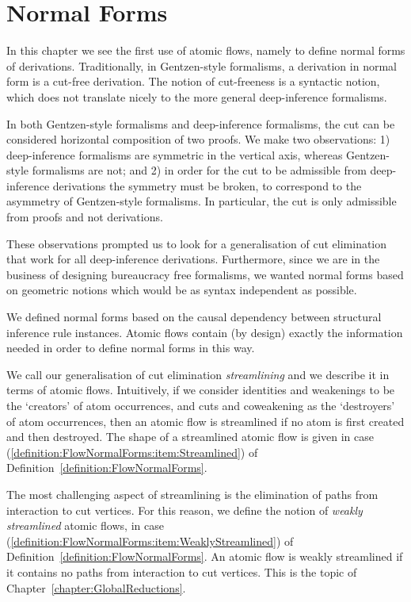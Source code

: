 \chapter{Normal Forms}\label{chapter:NormalForms}

In this chapter we see the first use of atomic flows, namely to define normal forms of derivations. Traditionally, in Gentzen-style formalisms, a derivation in normal form is a cut-free derivation. The notion of cut-freeness is a syntactic notion, which does not translate nicely to the more general deep-inference formalisms.

In both Gentzen-style formalisms and deep-inference formalisms, the cut can be considered horizontal composition of two proofs. We make two observations: 1) deep-inference formalisms are symmetric in the vertical axis, whereas Gentzen-style formalisms are not; and 2) in order for the cut to be admissible from deep-inference derivations the symmetry must be broken, to correspond to the asymmetry of Gentzen-style formalisms. In particular, the cut is only admissible from proofs and not derivations.

These observations prompted us to look for a generalisation of cut elimination that work for all deep-inference derivations. Furthermore, since we are in the business of designing bureaucracy free formalisms, we wanted normal forms based on geometric notions which would be as syntax independent as possible.

We defined normal forms based on the causal dependency between structural inference rule instances. Atomic flows contain (by design) exactly the information needed in order to define normal forms in this way.

We call our generalisation of cut elimination \emph{streamlining} and we describe it in terms of atomic flows. Intuitively, if we consider identities and weakenings to be the `creators' of atom occurrences, and cuts and coweakening as the `destroyers' of atom occurrences, then an atomic flow is streamlined if no atom is first created and then destroyed. The shape of a streamlined atomic flow is given in case (\ref{definition:FlowNormalForms:item:Streamlined}) of Definition~\ref{definition:FlowNormalForms}.

The most challenging aspect of streamlining is the elimination of paths from interaction to cut vertices. For this reason, we define the notion of \emph{weakly streamlined} atomic flows, in case (\ref{definition:FlowNormalForms:item:WeaklyStreamlined}) of Definition~\ref{definition:FlowNormalForms}. An atomic flow is weakly streamlined if it contains no paths from interaction to cut vertices. This is the topic of Chapter~\vref{chapter:GlobalReductions}.

